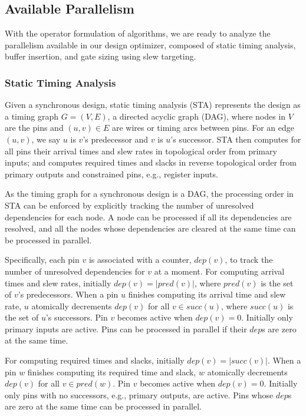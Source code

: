 \subsection{Available Parallelism}
\label{sec:avail_parallelism}

With the operator formulation of algorithms, we are ready to analyze the parallelism available in our design optimizer, composed of static timing analysis, buffer insertion, and gate sizing using slew targeting.

\subsubsection{Static Timing Analysis}
\label{sec:sta_parallel}

Given a synchronous design, static timing analysis (STA) represents the design as a timing graph $G = (V, E)$, a directed acyclic graph (DAG), where nodes in $V$ are the pins and $(u, v) \in E$ are wires or timing arcs between pins. For an edge $(u, v)$, we say $u$ is $v$'s predecessor and $v$ is $u$'s successor. STA then computes for all pins their arrival times and slew rates in topological order from primary inputs; and computes required times and slacks in reverse topological order from primary outputs and constrained pins, e.g., register inputs.

As the timing graph for a synchronous design is a DAG, the processing order in STA can be enforced by explicitly tracking the number of unresolved dependencies for each node. A node can be processed if all its dependencies are resolved, and all the nodes whose dependencies are cleared at the same time can be processed in parallel.

Specifically, each pin $v$ is associated with a counter, $dep(v)$, to track the number of unresolved dependencies for $v$ at a moment. For computing arrival times and slew rates, initially $dep(v) = |pred(v)|$, where $pred(v)$ is the set of $v$'s predecessors. When a pin $u$ finishes computing its arrival time and slew rate, $u$ atomically decrements $dep(v)$ for all $v \in succ(u)$, where $succ(u)$ is the set of $u$'s successors. Pin $v$ becomes active when $dep(v) = 0$. Initially only primary inputs are active. Pins can be processed in parallel if their $dep$s are zero at the same time.

For computing required times and slacks, initially $dep(v) = |succ(v)|$. When a pin $w$ finishes computing its required time and slack, $w$ atomically decrements $dep(v)$ for all $v \in pred(w)$. Pin $v$ becomes active when $dep(v) = 0$. Initially only pins with no successors, e.g., primary outputs, are active. Pins whose $dep$s are zero at the same time can be processed in parallel.

